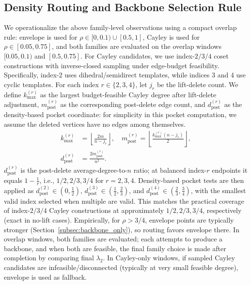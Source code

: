 \documentclass[letterpaper, 10 pt, conference]{ieeeconf}  %
\newcommand{\1}{\mathbf{1}}
\newcommand{\0}{\mathbf{0}}
\begin{document}
\subsection{Density Routing and Backbone Selection Rule}
We operationalize the above family-level observations using a compact overlap rule:
envelope is used for \(\rho\in[0,0.1)\cup[0.5,1]\), Cayley is used for \(\rho\in[0.05,0.75]\), and both families are evaluated on the overlap windows \([0.05,0.1)\) and \([0.5,0.75]\).
For Cayley candidates, we use index-\(2/3/4\) coset constructions with inverse-closed sampling under edge-budget feasibility.
Specifically, index-2 uses dihedral/semidirect templates, while indices 3 and 4 use cyclic templates.
For each index \(r\in\{2,3,4\}\), let \(j_r\) be the lift-delete count.
We define \(k_{\max}^{(r)}\) as the largest budget-feasible Cayley degree after lift-delete adjustment, \(m_{\mathrm{post}}^{(r)}\) as the corresponding post-delete edge count, and \(d_{\mathrm{post}}^{(r)}\) as the density-based pocket coordinate:
for simplicity in this pocket computation, we assume the deleted vertices have no edges among themselves.
\begin{equation}
\begin{aligned}
k_{\max}^{(r)}&=\left\lfloor\frac{2m}{n-j_r}\right\rfloor,\quad
m_{\mathrm{post}}^{(r)}=\left\lfloor\frac{k_{\max}^{(r)}(n-j_r)}{2}\right\rfloor,\\
d_{\mathrm{post}}^{(r)}&=\frac{2m_{\mathrm{post}}^{(r)}}{n^2}.
\end{aligned}
\label{eq:cayley_pocket}
\end{equation}
\(d_{\mathrm{post}}^{(r)}\) is the post-delete average-degree-to-\(n\) ratio; at balanced index-\(r\) endpoints it equals \(1-\frac{1}{r}\), i.e., \(1/2,2/3,3/4\) for \(r=2,3,4\).
Density-based pocket tests are then applied as \(d_{\mathrm{post}}^{(2)}\in(0,\tfrac{1}{2})\), \(d_{\mathrm{post}}^{(3)}\in(\tfrac{1}{2},\tfrac{2}{3})\), and \(d_{\mathrm{post}}^{(4)}\in(\tfrac{2}{3},\tfrac{3}{4})\), with the smallest valid index selected when multiple are valid.
This matches the practical coverage of index-\(2/3/4\) Cayley constructions at approximately \(1/2,2/3,3/4\), respectively (exact in no-lift cases). Empirically, for \(\rho>3/4\), envelope points are typically stronger (Section~\ref{subsec:backbone_only}), so routing favors envelope there.
In overlap windows, both families are evaluated; each attempts to produce a backbone, and when both are feasible, the final family choice is made after completion by comparing final \(\lambda_2\).
In Cayley-only windows, if sampled Cayley candidates are infeasible/disconnected (typically at very small feasible degree), envelope is used as fallback.
\end{document}
